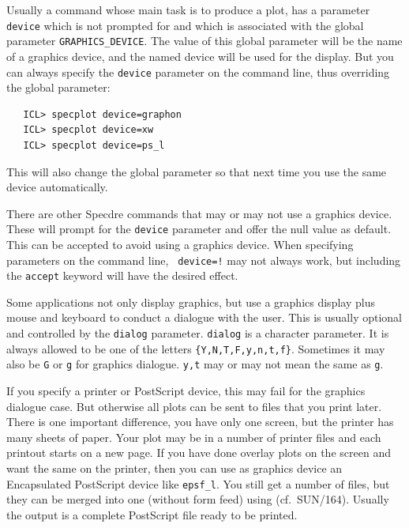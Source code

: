    Usually a command whose main task is to produce a plot, has a
   parameter {\tt device} which is not prompted for and which is
   associated with the global parameter {\tt GRAPHICS\_DEVICE}. The
   value of this global parameter will be the name of a graphics device,
   and the named device will be used for the display. But you can always
   specify the {\tt device} parameter on the command line, thus
   overriding the global parameter:

\begin{verbatim}
   ICL> specplot device=graphon
   ICL> specplot device=xw
   ICL> specplot device=ps_l
\end{verbatim}

   This will also change the global parameter so that next time you use
   the same device automatically.

   There are other Specdre commands that may or may not use a graphics
   device. These will prompt for the {\tt device} parameter and offer
   the null value as default. This can be accepted to avoid using a
   graphics device. When specifying parameters on the command line, {\tt
   device=!} may not always work, but including the {\tt accept} keyword
   will have the desired effect.

   Some applications not only display graphics, but use a graphics
   display plus mouse and keyboard to conduct a dialogue with the user.
   This is usually optional and controlled by the {\tt dialog}
   parameter.  {\tt dialog} is a character parameter.  It is always
   allowed to be one of the letters {\tt\{Y,N,T,F,y,n,t,f\}}.  Sometimes
   it may also be {\tt G} or {\tt g} for graphics dialogue.  {\tt y,t}
   may or may not mean the same as {\tt g}.

   If you specify a printer or PostScript device, this may fail for the
   graphics dialogue case.  But otherwise all plots can be sent to files
   that you print later.  There is one important difference, you have
   only one screen, but the printer has many sheets of paper.  Your plot
   may be in a number of printer files and each printout starts on a new
   page.  If you have done overlay plots on the screen and want the same
   on the printer, then you can use as graphics device an Encapsulated
   PostScript device like {\tt epsf\_l}.  You still get a number 
   of files, but they can be merged into one (without form feed) using
{\tt{}}
   (cf.\ SUN/164).  Usually the output is a complete PostScript file
   ready to be printed.

